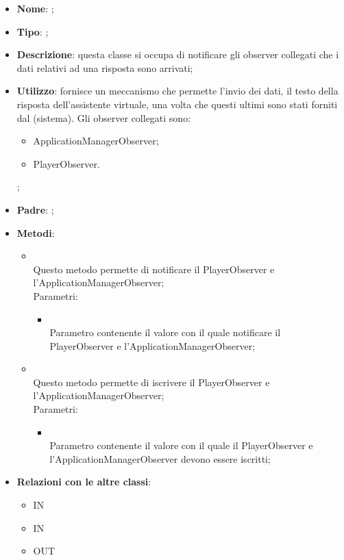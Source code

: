 \begin{itemize}
	\item \textbf{Nome}: ;
	\item \textbf{Tipo}: ;
	\item \textbf{Descrizione}: questa classe si occupa di notificare gli observer collegati che i dati relativi ad una risposta sono arrivati;
	\item \textbf{Utilizzo}: fornisce un meccanismo che permette l'invio dei dati, il testo della risposta dell'assistente virtuale, una volta che questi ultimi sono stati forniti dal (sistema).
Gli observer collegati sono:
\begin{itemize}
\item ApplicationManagerObserver;
\item PlayerObserver.
\end{itemize};
	\item \textbf{Padre}: ;
	\item \textbf{Metodi}:
	\begin{itemize}
		\item[]  \\
		Questo metodo permette di notificare il PlayerObserver e l'ApplicationManagerObserver;\\
		Parametri:
		\begin{itemize}
			\item {} \\
			Parametro contenente il valore con il quale notificare il PlayerObserver e l'ApplicationManagerObserver;
		\end{itemize}
		\item[]  \\
		Questo metodo permette di iscrivere il PlayerObserver e l'ApplicationManagerObserver;\\
		Parametri:
		\begin{itemize}
			\item {} \\
			Parametro contenente il valore con il quale il PlayerObserver e l'ApplicationManagerObserver devono essere iscritti;
		\end{itemize}
	\end{itemize}
	\item \textbf{Relazioni con le altre classi}:
	\begin{itemize}
		\item IN \hyperlink{DataArrivedObservable_label}{}
		\item IN \hyperlink{Logic_label}{}
		\item OUT \hyperlink{Logic_label}{}
	\end{itemize}
\end{itemize}
\FloatBarrier

